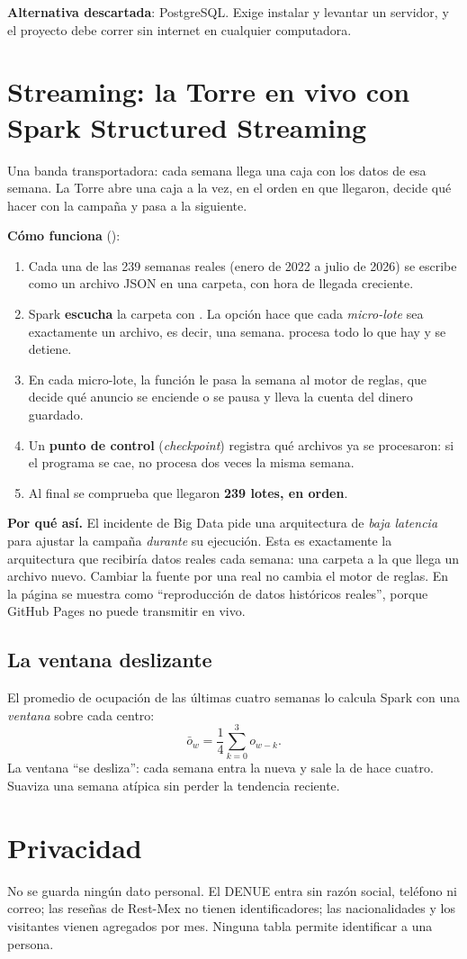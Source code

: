 \textbf{Alternativa descartada}: PostgreSQL. Exige instalar y levantar un servidor, y el proyecto debe correr sin
internet en cualquier computadora.

\section{Streaming: la Torre en vivo con Spark Structured Streaming}
\label{sec:streaming}
\begin{intuicion}
Una banda transportadora: cada semana llega una caja con los datos de esa semana. La Torre abre una caja a la vez, en el
orden en que llegaron, decide qué hacer con la campaña y pasa a la siguiente.
\end{intuicion}

\textbf{Cómo funciona} ():
\begin{enumerate}
\item Cada una de las 239 semanas reales (enero de 2022 a julio de 2026) se escribe como un archivo JSON en una carpeta,
  con hora de llegada creciente.
\item Spark \textbf{escucha} la carpeta con . La opción  hace que cada
  \emph{micro-lote} sea exactamente un archivo, es decir, una semana.  procesa todo lo
  que hay y se detiene.
\item En cada micro-lote, la función  le pasa la semana al motor de reglas, que decide qué anuncio se
  enciende o se pausa y lleva la cuenta del dinero guardado.
\item Un \textbf{punto de control} (\emph{checkpoint}) registra qué archivos ya se procesaron: si el programa se cae, no
  procesa dos veces la misma semana.
\item Al final se comprueba que llegaron \textbf{239 lotes, en orden}.
\end{enumerate}

\textbf{Por qué así.} El incidente de Big Data pide una arquitectura de \emph{baja latencia} para ajustar la campaña
\emph{durante} su ejecución. Esta es exactamente la arquitectura que recibiría datos reales cada semana: una carpeta a la
que llega un archivo nuevo. Cambiar la fuente por una real no cambia el motor de reglas. En la página se muestra como
``reproducción de datos históricos reales'', porque GitHub Pages no puede transmitir en vivo.

\subsection{La ventana deslizante}
El promedio de ocupación de las últimas cuatro semanas lo calcula Spark con una \emph{ventana} sobre cada centro:
\[
\bar o_w=\frac14\sum_{k=0}^{3}o_{w-k}.
\]
La ventana ``se desliza'': cada semana entra la nueva y sale la de hace cuatro. Suaviza una semana atípica sin perder la
tendencia reciente.

\section{Privacidad}
No se guarda ningún dato personal. El DENUE entra sin razón social, teléfono ni correo; las reseñas de Rest-Mex no tienen
identificadores; las nacionalidades y los visitantes vienen agregados por mes. Ninguna tabla permite identificar a una
persona.
